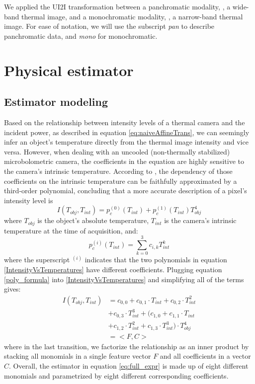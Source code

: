We applied the UI2I transformation between a panchromatic modality, \ie, a wide-band thermal image, and a monochromatic modality, \ie, a narrow-band thermal image.
For ease of notation, we will use the subscript \emph{pan} to describe panchromatic data, and \emph{mono} for monochromatic.

\section{Physical estimator}

\subsection{Estimator modeling}
Based on the relationship between intensity levels of a thermal camera and the incident power, as described in equation \ref{eq:naiveAffineTrans}, we can seemingly infer an object's temperature directly from the thermal image intensity and vice versa.
However, when dealing with an uncooled (non-thermally stabilized) microbolometric camera, the coefficients in the equation are highly sensitive to the camera's intrinsic temperature. 
According to \cite{10.1117/1.OE.52.6.061304}, the dependency of those coefficients on the intrinsic temperature can be faithfully approximated by a third-order polynomial, concluding that a more accurate description of a pixel's intensity level is
\begin{equation} \label{IntensityVsTemperatures}
  I(T_\mathit{obj}, T_\mathit{int}) = p^{(0)}_c(T_\mathit{int}) + p^{(1)}_c(T_\mathit{int}) T^4_\mathit{obj}
\end{equation}
where $T_\mathit{obj}$ is the object's absolute temperature, $T_\mathit{int}$ is the camera's intrinsic temperature at the time of acquisition, and:
\begin{equation} \label{poly_formula}
  p^{(i)}_c(T_\mathit{int}) = \sum_{k=0}^3  c_{i,k} T_\mathit{int}^k
\end{equation}
where the superscript $^{(i)}$ indicates that the two polynomials in equation \ref{IntensityVsTemperatures} have different coefficients.
Plugging equation \ref{poly_formula} into \ref{IntensityVsTemperatures} and simplifying all of the terms gives:
\begin{equation} \label{eq:full_expr}
  \begin{split}
    I(T_\mathit{obj}, T_\mathit{int}) &= c_{0,0} + c_{0,1} \cdot T_\mathit{int} + c_{0,2} \cdot T^2_\mathit{int} \\
    & + c_{0,3} \cdot T^3_\mathit{int} + (c_{1,0} + c_{1,1} \cdot T_\mathit{int} \\
    & + c_{1,2} \cdot T^2_\mathit{int} + c_{1,3} \cdot T^3_\mathit{int}) \cdot T^4_\mathit{obj} \\
    &= <F, C>
  \end{split}
\end{equation}
where in the last transition, we factorize the relationship as an inner product by stacking all monomials in a single feature vector $F$ and all coefficients in a vector $C$.
Overall, the estimator in equation \ref{eq:full_expr} is made up of eight different monomials and parametrized by eight different corresponding coefficients.


